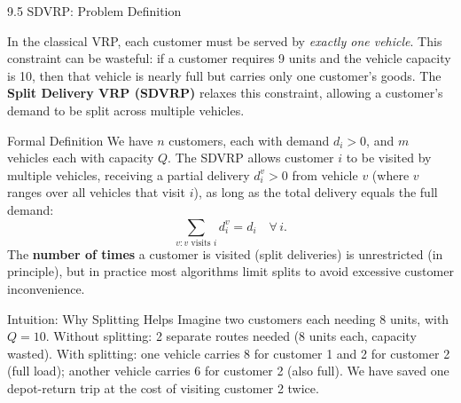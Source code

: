 \documentclass[aspectratio=169,10pt]{beamer}
\begin{document}
\begin{frame}[allowframebreaks]{9.5 SDVRP: Problem Definition}

In the classical VRP, each customer must be served by \emph{exactly one
vehicle}.  This constraint can be wasteful: if a customer requires 9 units
and the vehicle capacity is 10, then that vehicle is nearly full but carries
only one customer's goods.  The \textbf{Split Delivery VRP (SDVRP)} relaxes
this constraint, allowing a customer's demand to be split across multiple
vehicles.

\begin{block}{Formal Definition}
  We have $n$ customers, each with demand $d_i > 0$, and $m$ vehicles each
  with capacity $Q$.  The SDVRP allows customer $i$ to be visited by multiple
  vehicles, receiving a partial delivery $d_i^v > 0$ from vehicle $v$ (where
  $v$ ranges over all vehicles that visit $i$), as long as the total delivery
  equals the full demand:
  \[
    \sum_{v: v \text{ visits } i} d_i^v = d_i \quad \forall\, i.
  \]
  The \textbf{number of times} a customer is visited (split deliveries) is
  unrestricted (in principle), but in practice most algorithms limit splits
  to avoid excessive customer inconvenience.
\end{block}

\begin{block}{Intuition: Why Splitting Helps}
  Imagine two customers each needing 8 units, with $Q = 10$.  Without
  splitting: 2 separate routes needed (8 units each, capacity wasted).  With
  splitting: one vehicle carries 8 for customer 1 and 2 for customer 2
  (full load); another vehicle carries 6 for customer 2 (also full).  We
  have saved one depot-return trip at the cost of visiting customer 2 twice.
\end{block}

\end{frame}
\end{document}
